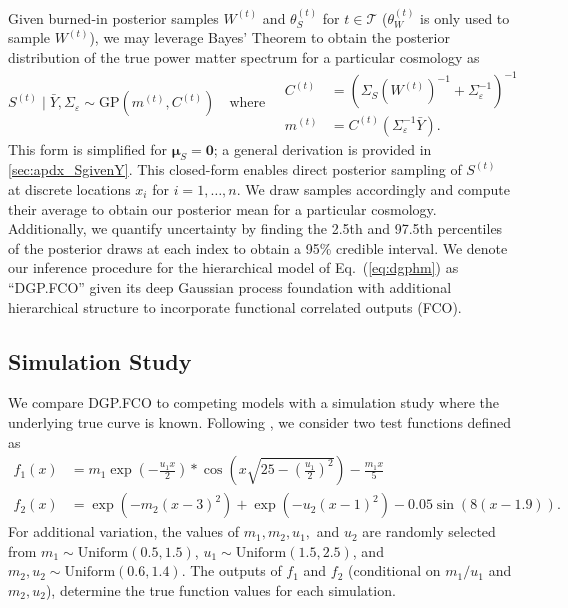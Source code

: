 \documentclass[11pt]{article}
\begin{document}
Given burned-in posterior samples $W^{(t)}$ and $\theta_S^{(t)}$
for $t\in\mathcal{T}$ ($\theta_W^{(t)}$ is only used to sample $W^{(t)}$), 
we may leverage Bayes' Theorem to obtain the
posterior distribution of the true power matter spectrum for a particular cosmology as
\[
S^{(t)}\mid\bar{Y}, \Sigma_\varepsilon \sim \mathrm{GP}(m^{(t)}, C^{(t)})
\quad\textrm{where}\quad
\begin{array}{rl}
C^{(t)}&=\left(\Sigma_S(W^{(t)})^{-1}+\Sigma_\varepsilon^{-1}\right)^{-1} \\
m^{(t)}&=C^{(t)}\left(\Sigma_\varepsilon^{-1}\bar{Y}\right).
\end{array}
\] 
This form is simplified for $\boldsymbol{\mu}_S=\mathbf{0}$; a general derivation 
is provided in \ref{sec:apdx_SgivenY}.  This closed-form enables direct posterior
sampling of $S^{(t)}$ at discrete locations $x_i$ for $i=1,\dots, n$.  
We draw samples accordingly and compute their average 
to obtain our posterior mean for a particular cosmology. 
Additionally, we quantify uncertainty by finding the 2.5th and 97.5th percentiles 
of the posterior draws at each index to obtain a 95\% credible interval.
We denote our inference procedure for the hierarchical model of Eq.~(\ref{eq:dgphm}) as
``DGP.FCO'' given its deep Gaussian process foundation with additional hierarchical
structure to incorporate functional correlated outputs (FCO).

\subsection{Simulation Study}
\label{subsec:sim}

We compare DGP.FCO to competing models with a simulation study where the underlying 
true curve is known. Following \cite{moran2023mira}, we consider two test functions 
defined as
\[
\begin{aligned}
  f_1(x) &= m_1 \exp\left(-\frac{u_1x}{2}\right) * 
  \cos\left(x\sqrt{25-\left(\frac{u_1}{2}\right)^2}\right) - \frac{m_1x}{5}\\
  f_2(x) &= \exp\left(-m_2(x-3)^2\right) + 
  \exp\left(-u_2(x-1)^2\right)-0.05\sin\left(8(x-1.9)\right).
\end{aligned}
\]
For additional variation, the values of $m_1, m_2, u_1,$ and $u_2$ are randomly selected from
$m_1 \sim \text{Uniform}(0.5,1.5)$, $u_1 \sim \text{Uniform}(1.5,2.5)$, and $m_2,u_2 
\sim \text{Uniform}(0.6,1.4)$. The outputs of $f_1$ and $f_2$ (conditional on $m_1/u_1$ and 
$m_2,u_2$), determine the true function values for each simulation.
      
\end{document}

